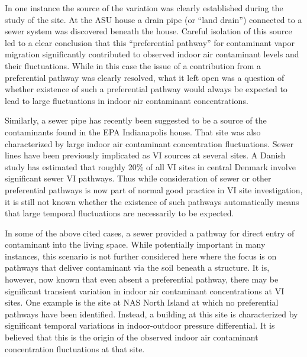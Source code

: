 \documentclass[journal=esthag,manuscript=article]{achemso}
\begin{document}
In one instance the source of the variation was clearly established during the study of the site.
At the ASU house a drain pipe (or “land drain”) connected to a sewer system was discovered beneath the house.
Careful isolation of this source led to a clear conclusion that this “preferential pathway” for contaminant vapor migration significantly contributed to observed indoor air contaminant levels and their fluctuations\cite{guo_vapor_2015,guo_identification_2015}.
While in this case the issue of a contribution from a preferential pathway was clearly resolved, what it left open was a question of whether existence of such a preferential pathway would always be expected to lead to large fluctuations in indoor air contaminant concentrations.\par

Similarly, a sewer pipe has recently been suggested to be a source of the contaminants found in the EPA Indianapolis house.
That site was also characterized by large indoor air contaminant concentration fluctuations\cite{mchugh_evidence_2017,u.s._environmental_protection_agency_assessment_2015}.
Sewer lines have been previously implicated as VI sources at several sites\cite{pennell_sewer_2013,mchugh_evidence_2017,roghani_occurrence_2018,riis_vapor_2010}.
A Danish study has estimated that roughly 20\% of all VI sites in central Denmark involve significant sewer VI pathways\cite{nielsen_remediation_2017}.
Thus while consideration of sewer or other preferential pathways is now part of normal good practice in VI site investigation\cite{u.s._environmental_protection_agency_oswer_2015}, it is still not known whether the existence of such pathways automatically means that large temporal fluctuations are necessarily to be expected.\par

In some of the above cited cases\cite{pennell_sewer_2013,riis_vapor_2010}, a sewer provided a pathway for direct entry of contaminant into the living space.
While potentially important in many instances, this scenario is not further considered here where the focus is on pathways that deliver contaminant via the soil beneath a structure.
It is, however, now known that even absent a preferential pathway, there may be significant transient variation in indoor air contaminant concentrations at VI sites\cite{folkes_observed_2009,brenner_results_2010,johnston_spatiotemporal_2014}.
One example is the site at NAS North Island at which no preferential pathways have been identified.
Instead, a building at this site is characterized by significant temporal variations in indoor-outdoor pressure differential\cite{hosangadi_high-frequency_2017}.
It is believed that this is the origin of the observed indoor air contaminant concentration fluctuations at that site.\par
\end{document}
